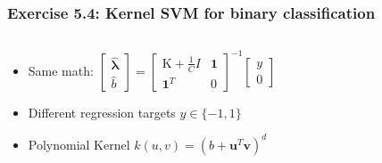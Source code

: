 \documentclass[10pt,aspectratio=169,handout]{beamer}
\begin{document}
\begin{frame}
    \frametitle{Exercise 5.4: Kernel SVM for binary classification}

    \begin{columns}
    \begin{column}{0.5\textwidth}
    \begin{itemize}
        \item Same math: $\begin{bmatrix} \boldsymbol{\hat{\lambda}} \\ \hat{b} \end{bmatrix} = \begin{bmatrix}\text{K} + \frac{1}{C}I & \boldsymbol{1} \\ \boldsymbol{1}^T & 0\end{bmatrix}^{-1} \begin{bmatrix} y \\ 0 \end{bmatrix} $
        \item Different regression targets $y \in \{-1, 1\}$
        \item Polynomial Kernel $k(u, v) = (b + \boldsymbol{u}^T\boldsymbol{v})^{d}$
    \end{itemize}
    \end{column}

    \begin{column}{0.5\textwidth}
        \inputminted[bgcolor=LightGray,fontsize=\small]{python}{code/svm.py}
    \end{column}
    \end{columns}
\end{frame}
\end{document}
